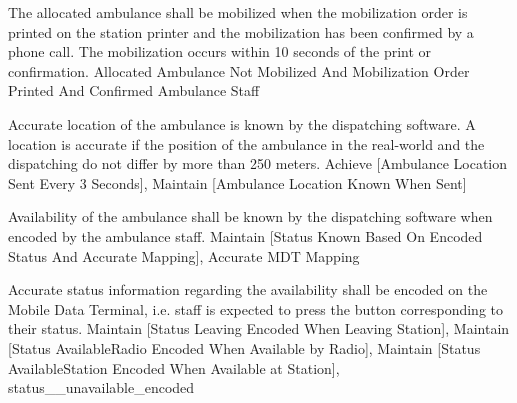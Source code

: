   \startkaosspec
  	 {The allocated ambulance shall be mobilized when the mobilization order is printed on the station printer and the mobilization has been confirmed by a phone call. The mobilization occurs within 10 seconds of the print or confirmation.}
  	 {Allocated Ambulance Not Mobilized And Mobilization Order Printed And Confirmed}
  	 {Ambulance Staff}
  \stopkaosspec

  
    {}

  \startkaosspec
  	 {Accurate location of the ambulance is known by the dispatching software. A location is accurate if the position of the ambulance in the real-world and the dispatching do not differ by more than 250 meters.}
  	 {Achieve [Ambulance Location Sent Every 3 Seconds], Maintain [Ambulance Location Known When Sent]}
  \stopkaosspec
  
  
    {}

  \startkaosspec
  	 {Availability of the ambulance shall be known by the dispatching software when encoded by the ambulance staff.}
  	 {Maintain [Status Known Based On Encoded Status And Accurate Mapping], Accurate MDT Mapping}
  \stopkaosspec
  
  \startkaosspec
  	 {Accurate status information regarding the availability shall be encoded on the Mobile Data Terminal, i.e. staff is expected to press the button corresponding to their status.}
  	 {Maintain [Status Leaving Encoded When Leaving Station], Maintain [Status AvailableRadio Encoded When Available by Radio], Maintain [Status AvailableStation Encoded When Available at Station], status__unavailable_encoded}
  \stopkaosspec
  
